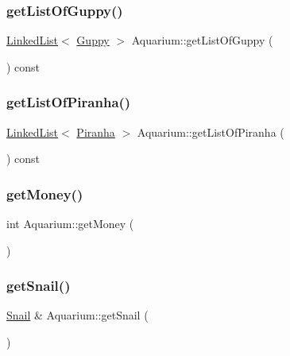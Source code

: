 \mbox{\label{class_aquarium_a745e4d67436255cc4dbb4285d6413eb3}} 
\subsubsection{\texorpdfstring{get\+List\+Of\+Guppy()}{getListOfGuppy()}}
{\footnotesize\ttfamily \mbox{\hyperlink{class_linked_list}{Linked\+List}}$<$ \mbox{\hyperlink{class_guppy}{Guppy}} $>$ Aquarium\+::get\+List\+Of\+Guppy (\begin{DoxyParamCaption}{ }\end{DoxyParamCaption}) const}

\mbox{\label{class_aquarium_a3fb338105afbdb86806f721a2bf15dda}} 
\subsubsection{\texorpdfstring{get\+List\+Of\+Piranha()}{getListOfPiranha()}}
{\footnotesize\ttfamily \mbox{\hyperlink{class_linked_list}{Linked\+List}}$<$ \mbox{\hyperlink{class_piranha}{Piranha}} $>$ Aquarium\+::get\+List\+Of\+Piranha (\begin{DoxyParamCaption}{ }\end{DoxyParamCaption}) const}

\mbox{\label{class_aquarium_a7622156e901ca61c60b32ed8f6f5ace9}} 
\subsubsection{\texorpdfstring{get\+Money()}{getMoney()}}
{\footnotesize\ttfamily int Aquarium\+::get\+Money (\begin{DoxyParamCaption}{ }\end{DoxyParamCaption})}

\mbox{\label{class_aquarium_aeba34bc057163d89f62f7ed06fad4075}} 
\subsubsection{\texorpdfstring{get\+Snail()}{getSnail()}}
{\footnotesize\ttfamily \mbox{\hyperlink{class_snail}{Snail}} \& Aquarium\+::get\+Snail (\begin{DoxyParamCaption}{ }\end{DoxyParamCaption})}

